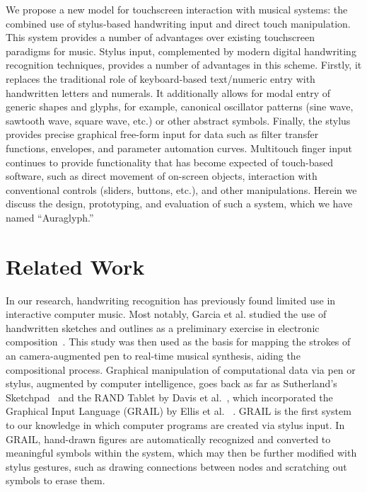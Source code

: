 \documentclass{nime-alternate}
\begin{document}
We propose a new model for touchscreen interaction with musical systems: the combined use of stylus-based handwriting input and direct touch manipulation. 
This system provides a number of advantages over existing touchscreen paradigms for music. 
Stylus input, complemented by modern digital handwriting recognition techniques, provides a number of advantages in this scheme. 
Firstly, it replaces the traditional role of keyboard-based text/numeric entry with handwritten letters and numerals.
It additionally allows for modal entry of generic shapes and glyphs, for example, canonical oscillator patterns (sine wave, sawtooth wave, square wave, etc.) or other abstract symbols.
Finally, the stylus provides precise graphical free-form input for data such as filter transfer functions, envelopes, and parameter automation curves. 
Multitouch finger input continues to provide functionality that has become expected of touch-based software, such as direct movement of on-screen objects, interaction with conventional controls (sliders, buttons, etc.), and other manipulations. 
Herein we discuss the design, prototyping, and evaluation of such a system, which we have named ``Auraglyph.''


\section{Related Work}
\label{sec:RelatedWork}

In our research, handwriting recognition has previously found limited use in interactive computer music. 
Most notably, Garcia et al. studied the use of handwritten sketches and outlines as a preliminary exercise in electronic composition~\cite{garcia2011inksplorer}.
This study was then used as the basis for mapping the strokes of an camera-augmented pen to real-time musical synthesis, aiding the compositional process. 
Graphical manipulation of computational data via pen or stylus, augmented by computer intelligence, goes back as far as Sutherland's Sketchpad~\cite{sutherland1964sketch} and the RAND Tablet by Davis et al.~\cite{davis1964rand}, which incorporated the Graphical Input Language (GRAIL) by Ellis et al. ~\cite{ellis1969grail}. 
GRAIL is the first system to our knowledge in which computer programs are created via stylus input. 
In GRAIL, hand-drawn figures are automatically recognized and converted to meaningful symbols within the system, which may then be further modified with stylus gestures, such as drawing connections between nodes and scratching out symbols to erase them. 
\end{document}
